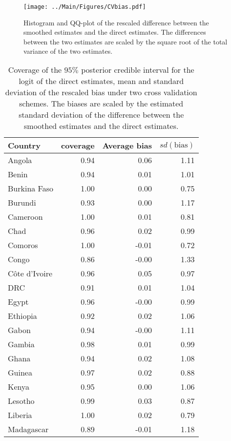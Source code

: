 \documentclass[12pt]{article}\usepackage[]{graphicx}\usepackage[]{color}
\begin{document}
\begin{figure}[htb]
\centering
\texttt{[image: ../Main/Figures/CVbias.pdf]}
\caption{Histogram and QQ-plot of the rescaled difference between the smoothed estimates and the direct estimates. The differences between the two estimates are scaled by the square root of the total variance of the two estimates.}
\label{fig:var}
\end{figure}


\begin{table}[ht]
\centering
\caption{Coverage of the $95\%$ posterior credible interval for the logit of the direct estimates, mean and standard deviation of the rescaled bias under two cross validation schemes. The biases are scaled by the estimated standard deviation of the difference between the smoothed estimates and the direct estimates.}
\label{tab:cv}
\begin{tabular}{lrrr}
  \toprule
Country & coverage & Average bias & $sd(\mbox{bias})$ \\ 
  \midrule
Angola & 0.94 & 0.06 & 1.11 \\ 
  Benin & 0.94 & 0.01 & 1.01 \\ 
  Burkina Faso & 1.00 & 0.00 & 0.75 \\ 
  Burundi & 0.93 & 0.00 & 1.17 \\ 
  Cameroon & 1.00 & 0.01 & 0.81 \\ 
  Chad & 0.96 & 0.02 & 0.99 \\ 
  Comoros & 1.00 & -0.01 & 0.72 \\ 
  Congo & 0.86 & -0.00 & 1.33 \\ 
   C\^{o}te d'Ivoire & 0.96 & 0.05 & 0.97 \\ 
  DRC & 0.91 & 0.01 & 1.04 \\ 
  Egypt & 0.96 & -0.00 & 0.99 \\ 
  Ethiopia & 0.92 & 0.02 & 1.06 \\ 
  Gabon & 0.94 & -0.00 & 1.11 \\ 
  Gambia & 0.98 & 0.01 & 0.99 \\ 
  Ghana & 0.94 & 0.02 & 1.08 \\ 
  Guinea & 0.97 & 0.02 & 0.88 \\ 
  Kenya & 0.95 & 0.00 & 1.06 \\ 
  Lesotho & 0.99 & 0.03 & 0.87 \\ 
  Liberia & 1.00 & 0.02 & 0.79 \\ 
  Madagascar & 0.89 & -0.01 & 1.18 \\ 

\end{tabular}
\end{table}
\end{document}
